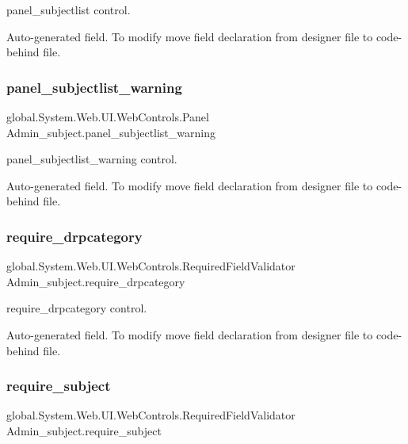 panel\+\_\+subjectlist control. 

Auto-\/generated field. To modify move field declaration from designer file to code-\/behind file. \mbox{\label{class_admin__subject_ab0039b3853960b22adc6541c55605754}} 
\subsubsection{\texorpdfstring{panel\_subjectlist\_warning}{panel\_subjectlist\_warning}}
{\footnotesize\ttfamily global.\+System.\+Web.\+U\+I.\+Web\+Controls.\+Panel Admin\+\_\+subject.\+panel\+\_\+subjectlist\+\_\+warning\hspace{0.3cm}{\ttfamily [protected]}}



panel\+\_\+subjectlist\+\_\+warning control. 

Auto-\/generated field. To modify move field declaration from designer file to code-\/behind file. \mbox{\label{class_admin__subject_aaed9d8a4f7fb46df05ce3394ec7af2a1}} 
\subsubsection{\texorpdfstring{require\_drpcategory}{require\_drpcategory}}
{\footnotesize\ttfamily global.\+System.\+Web.\+U\+I.\+Web\+Controls.\+Required\+Field\+Validator Admin\+\_\+subject.\+require\+\_\+drpcategory\hspace{0.3cm}{\ttfamily [protected]}}



require\+\_\+drpcategory control. 

Auto-\/generated field. To modify move field declaration from designer file to code-\/behind file. \mbox{\label{class_admin__subject_a6fe3d462469595075e89ee44c72c1f05}} 
\subsubsection{\texorpdfstring{require\_subject}{require\_subject}}
{\footnotesize\ttfamily global.\+System.\+Web.\+U\+I.\+Web\+Controls.\+Required\+Field\+Validator Admin\+\_\+subject.\+require\+\_\+subject\hspace{0.3cm}{\ttfamily [protected]}}



